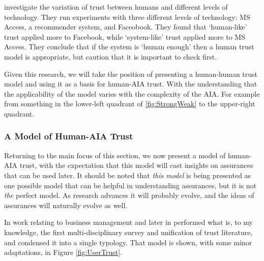 
        \citet{Tripp2011-cq} investigate the variation of trust between humans and different levels of technology. They run experiments with three different levels of technology: MS Access, a recommender system, and Faceobook. They found that `human-like' trust applied more to Facebook, while `system-like' trust applied more to MS Access. They conclude that if the system is `human enough' then a human trust model is appropriate, but caution that it is important to check first.

        Given this research, we will take the position of presenting a human-human trust model and using it as a basis for human-AIA trust. With the understanding that the applicability of the model varies with the complexity of the AIA. For example from something in the lower-left quadrant of \ref{fig:StrongWeak} to the upper-right quadrant.

    \subsubsection{A Model of Human-AIA Trust}
        Returning to the main focus of this section, we now present a model of human-AIA trust, with the expectation that this model will cast insights on assurances that can be used later. It should be noted that \emph{this model} is being presented as one possible model that can be helpful in understanding assurances, but it is not \emph{the} perfect model. As research advances it will probably evolve, and the ideas of assurances will naturally evolve as well.

        In work relating to business management \citet{McKnight1998-ty} and later in \cite{McKnight2001-fa} performed what is, to my knowledge, the first multi-disciplinary survey and unification of trust literature, and condensed it into a single typology. That model is shown, with some minor adaptations, in Figure \ref{fig:UserTrust}.

